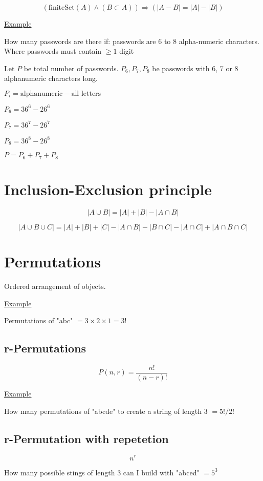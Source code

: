 \documentclass[12pt]{article}
\begin{document}
\begin{spacing}{1.5}
$$(\text{finiteSet}(A) \wedge (B \subset A)) \Rightarrow (|A-B| = |A|-|B|)$$

\underline{Example}

How many passwords are there if: passwords are 6 to 8 alpha-numeric characters. Where passwords must contain $\ge 1$ digit

Let $P$ be total number of passwords. $P_6, P_7, P_8$ be passwords with 6, 7 or 8 alphanumeric characters long. 

$P_i = \text{alphanumeric} - \text{all letters}$

$P_6 = 36^6 - 26^6$

$P_7 = 36^7 - 26^7$

$P_8 = 36^8 - 26^8$

$P = P_6 + P_7 + P_8$

\section{Inclusion-Exclusion principle}

$$|A \cup B| = |A| + |B| - |A \cap B|$$

$$|A \cup B \cup C| = |A| + |B| + |C| - |A \cap B| - |B \cap C| - |A \cap C| + |A \cap B \cap C|$$

\section{Permutations}

Ordered arrangement of objects. 

\underline{Example}

Permutations of "abc" $ = 3 \times 2 \times 1 = 3!$

\subsection{r-Permutations}

$$P(n, r) = \frac{n!}{(n-r)!}$$

\underline{Example}

How many permutations of "abcde" to create a string of length 3 $ = 5! / 2!$

\subsection{r-Permutation with repetetion}

$$n^r$$

How many possible stings of length 3 can I build with "abced" $ = 5^3$


\end{spacing}
\end{document}
